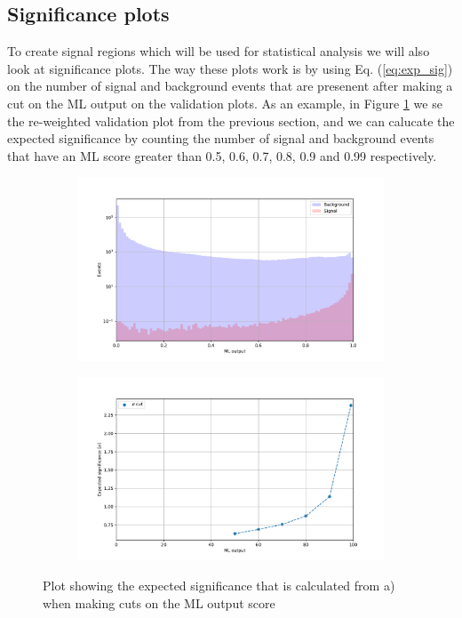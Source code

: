 \documentclass[12pt, a4paper]{book}
\begin{document}
\clearpage
\subsection{Significance plots}\label{sec:siggy}
To create signal regions which will be used for statistical analysis we will also look at significance plots. The way these plots work is by using Eq. (\ref{eq:exp_sig}) on the number of signal and background events that are presenent after making a cut on the ML output on the validation plots. 
As an example, in Figure \ref{fig:EXP_SIG} we se the re-weighted validation plot from the previous section, and we can calucate the expected significance by counting the number of signal and background events that have an ML score greater than 0.5, 0.6, 0.7, 0.8, 0.9 and 0.99 respectively.
\begin{figure}[!ht]
	\centering
    \begin{subfigure}[b]{0.7\textwidth}
        \centering
        \includegraphics[width=\textwidth]{VAL.pdf}
    \end{subfigure}
    \hfill
    \begin{subfigure}[b]{0.7\textwidth}
        \centering
        \includegraphics[width=\textwidth]{EXP_SIG.pdf}
    \end{subfigure}
    \caption[Significance plot illustration]{Plot showing the expected significance that is calculated from a) when making cuts on the ML output score}\label{fig:EXP_SIG}
\end{figure}
\end{document}
